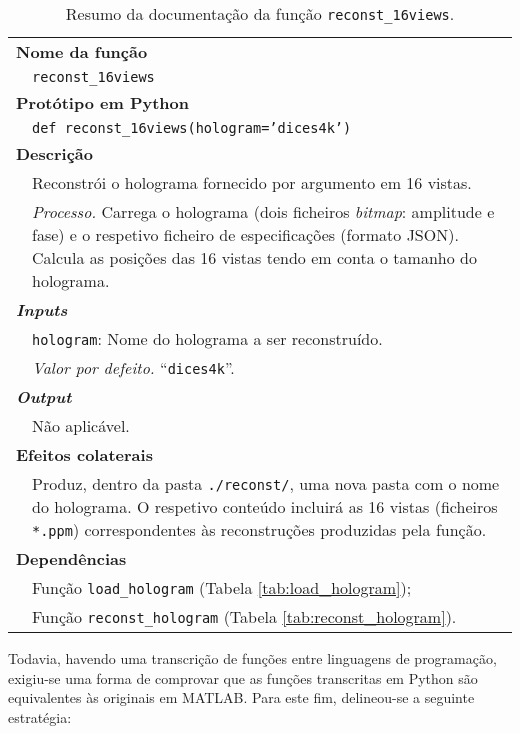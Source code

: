 \begin{table}[!hp]
    \centering
    \caption{Resumo da documentação da função \texttt{reconst\_16views}.}
    \label{tab:reconst_16views}
    \begin{tabular}{p{1cm} p{10cm}}
        \hline
        \multicolumn{2}{l}{\bfseries Nome da função}\\
         & \verb|reconst_16views|\\
        \hline
        \multicolumn{2}{l}{\bfseries Protótipo em Python}\\
         & \texttt{def reconst_16views(hologram='dices4k')} \\
        \hline\multicolumn{2}{l}{\bfseries Descrição}\\
         & Reconstrói o holograma fornecido por argumento em 16 vistas. \\
         & \textit{Processo.} Carrega o holograma (dois ficheiros \textit{bitmap}: amplitude e fase) e o respetivo ficheiro de especificações (formato JSON). Calcula as posições das 16 vistas tendo em conta o tamanho do holograma.\\
        \hline\multicolumn{2}{l}{\bfseries \textit{Inputs}}\\
         & \verb|hologram|: Nome do holograma a ser reconstruído.\\
         & \hspace{1cm} \textit{Valor por defeito.} ``\verb|dices4k|''.\\
        \hline\multicolumn{2}{l}{\bfseries \textit{Output}}\\
         & Não aplicável.\\
        \hline\multicolumn{2}{l}{\bfseries Efeitos colaterais}\\
         & Produz, dentro da pasta \verb|./reconst/|, uma nova pasta com o nome do holograma. O respetivo conteúdo incluirá as 16 vistas (ficheiros \verb|*.ppm|) correspondentes às reconstruções produzidas pela função.\\
        \hline\multicolumn{2}{l}{\bfseries Dependências}\\
         & Função \verb|load_hologram| (Tabela \ref{tab:load_hologram}); \\
         & Função \verb|reconst_hologram| (Tabela \ref{tab:reconst_hologram}). \\
        \hline
    \end{tabular}
\end{table}

Todavia, havendo uma transcrição de funções entre linguagens de programação, exigiu-se uma forma de comprovar que as funções transcritas em Python são equivalentes às originais em MATLAB. Para este fim, delineou-se a seguinte estratégia:

